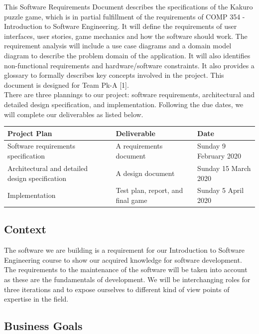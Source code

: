 \documentclass[12pt]{article}
\begin{document}
This Software Requirements Document describes the specifications of the Kakuro puzzle game, which is in partial fulfillment of the requirements of COMP 354 - Introduction to Software Engineering. It will define the requirements of user interfaces, user stories, game mechanics and how the software should work. The requirement analysis will include a use case diagrams and a domain model diagram to describe the problem domain of the application. It will also identifies non-functional requirements and hardware/software constraints. It also provides a glossary to formally describes key concepts involved in the project. This document is designed for Team Pk-A [1]. \\

There are three plannings to our project: software requirements, architectural and detailed design specification, and implementation. Following the due dates, we will complete our deliverables as listed below.

\begin{center}
\setlength{\tabcolsep}{20pt}
\renewcommand{\arraystretch}{2}
\begin{tabular}{ |p{4cm}|p{4cm}|p{4cm}| }
\hline
Project Plan & Deliverable & Date \\
\hline
Software requirements specification & A requirements document & Sunday 9 February 2020 \\ 
\hline
Architectural and detailed design specification & A design document & Sunday 15 March 2020 \\ 
\hline
Implementation & Test plan, report, and final game & Sunday 5 April 2020 \\ 
\hline
\end{tabular}
\end{center}
 
\subsection{Context}

The software we are building is a requirement for our Introduction to Software Engineering course to show our acquired knowledge for software development. The requirements to the maintenance of the software will be taken into account as these are the fundamentals of development. We will be interchanging roles for three iterations and to expose ourselves to different kind of view points of expertise in the field.

\subsection{Business Goals}
\end{document}
